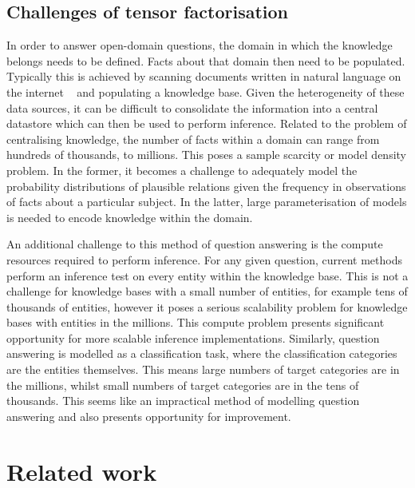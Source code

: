\subsection{Challenges of tensor factorisation} 

In order to answer open-domain questions, the domain in which the knowledge belongs needs to be defined. Facts about that domain then need to be populated. Typically this is achieved by scanning documents written in natural language on the internet \unskip~\citep{fader2011identifying, dong2014knowledge} and populating a knowledge base. Given the heterogeneity of these data sources, it can be difficult to consolidate the information into a central datastore which can then be used to perform inference.  Related to the problem of centralising knowledge, the number of facts within a domain can range from hundreds of thousands, to millions. This poses a sample scarcity or model density problem. In the former, it becomes a challenge to adequately model the probability distributions of plausible relations given the frequency in observations of facts about a particular subject. In the latter, large parameterisation of models is needed to encode knowledge within the domain. \par

\noindent An additional challenge to this method of question answering is the compute resources required to perform inference. For any given question, current methods perform an inference test on every entity within the knowledge base. This is not a challenge for knowledge bases with a small number of entities, for example tens of thousands of entities, however it poses a serious scalability problem for knowledge bases with entities in the millions. This compute problem presents significant opportunity for more scalable inference implementations. Similarly, question answering is modelled as a classification task, where the classification categories are the entities themselves. This means large numbers of target categories are in the millions, whilst small numbers of target categories are in the tens of thousands. This seems like an impractical method of modelling question answering and also presents opportunity for improvement. 



\section{Related work} %

